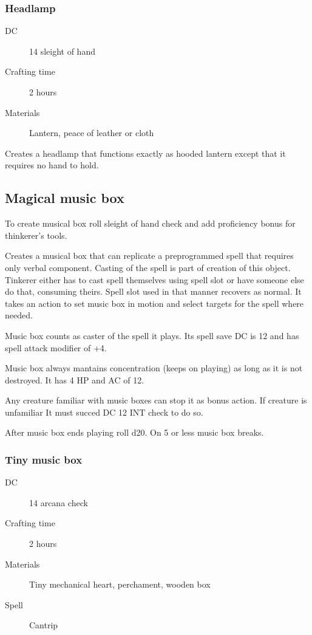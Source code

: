 \subsubsection{Headlamp}

\begin{description}
\item [DC] 14 sleight of hand
\item [Crafting time] 2 hours
\item [Materials] Lantern, peace of leather or cloth
\end{description}

Creates a headlamp that functions exactly as hooded lantern except that it requires no hand to hold.

\subsection{Magical music box}

To create musical box roll sleight of hand check and add proficiency bonus for thinkerer's tools.

Creates a musical box that can replicate a preprogrammed spell that requires only verbal component. Casting of the spell is part of
creation of this object. Tinkerer either has to cast spell themselves using spell slot or have someone else do that, consuming theirs. Spell slot used in that manner recovers as normal. It takes an action to set music box in motion and select targets for the spell where needed.

Music box counts as caster of the spell it plays. Its spell save DC is 12 and has spell attack modifier of +4.

Music box always mantains concentration (keeps on playing) as long as it is not destroyed. It has 4 HP and AC of 12.

Any creature familiar with music boxes can stop it as bonus action. If creature is unfamiliar It must succed DC 12 INT check to do so.

After music box ends playing roll d20. On 5 or less music box breaks.

\subsubsection{Tiny music box}

\begin{description}
\item [DC] 14 arcana check
\item [Crafting time] 2 hours
\item [Materials] Tiny mechanical heart, perchament, wooden box
\item [Spell] Cantrip
\end{description}

